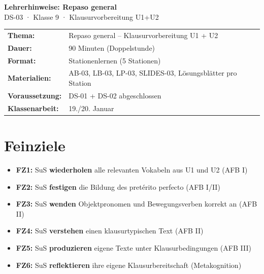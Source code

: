 \documentclass[11pt, a4paper]{article}
\begin{document}

\begin{center}
    {\LARGE\bfseries Lehrerhinweise: Repaso general}\\[6pt]
    {\large DS-03 · Klasse 9 · Klausurvorbereitung U1+U2}
\end{center}

\vspace{8pt}


\begin{infobox}[Stundenübersicht]
\begin{tabular}{@{}ll@{}}
\textbf{Thema:} & Repaso general -- Klausurvorbereitung U1 + U2 \\
\textbf{Dauer:} & 90 Minuten (Doppelstunde) \\
\textbf{Format:} & Stationenlernen (5 Stationen) \\
\textbf{Materialien:} & AB-03, LB-03, LP-03, SLIDES-03, Lösungsblätter pro Station \\
\textbf{Voraussetzung:} & DS-01 + DS-02 abgeschlossen \\
\textbf{Klassenarbeit:} & 19./20. Januar \\
\end{tabular}
\end{infobox}

\vspace{8pt}


\section*{Feinziele}

\begin{itemize}[leftmargin=1.5em]
    \item \textbf{FZ1:} SuS \textbf{wiederholen} alle relevanten Vokabeln aus U1 und U2 (AFB I)
    \item \textbf{FZ2:} SuS \textbf{festigen} die Bildung des pretérito perfecto (AFB I/II)
    \item \textbf{FZ3:} SuS \textbf{wenden} Objektpronomen und Bewegungsverben korrekt an (AFB II)
    \item \textbf{FZ4:} SuS \textbf{verstehen} einen klausurtypischen Text (AFB II)
    \item \textbf{FZ5:} SuS \textbf{produzieren} eigene Texte unter Klausurbedingungen (AFB III)
    \item \textbf{FZ6:} SuS \textbf{reflektieren} ihre eigene Klausurbereitschaft (Metakognition)
\end{itemize}
\end{document}
